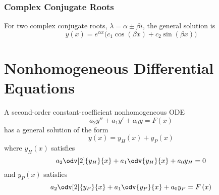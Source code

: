 \documentclass{article}
\begin{document}
\subsubsection{Complex Conjugate Roots}
For two complex conjugate roots, \(\lambda = \alpha \pm \beta i\), the
general solution is
\begin{equation*}
    y\left( x \right) = e^{\alpha x}\bigl( c_1\cos{\left( \beta x \right)} + c_2 \sin{\left( \beta x \right)} \bigr)
\end{equation*}
\section{Nonhomogeneous Differential Equations}
A second-order constant-coefficient nonhomogeneous ODE
\begin{equation*}
    a_2y'' + a_1y' + a_0y = F\left( x \right)
\end{equation*}
has a general solution of the form
\begin{equation*}
    y\left( x \right) = y_H\left( x \right) + y_P\left( x \right)
\end{equation*}
where \(y_H\left( x \right)\) satisfies
\begin{equation*}
    a_2\odv[2]{y_H}{x} + a_1\odv{y_H}{x} + a_0y_H = 0
\end{equation*}
and \(y_P\left( x \right)\) satisfies
\begin{equation*}
    a_2\odv[2]{y_P}{x} + a_1\odv{y_P}{x} + a_0y_P = F\left( x \right)
\end{equation*}
\end{document}
